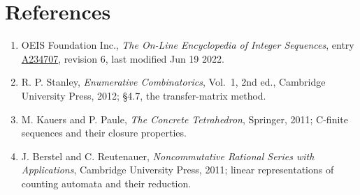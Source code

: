 \documentclass[11pt]{article}
\theoremstyle{definition}
\begin{document}
\section{References}

\begin{enumerate}

\item OEIS Foundation Inc., \emph{The On-Line Encyclopedia of Integer Sequences}, entry \href{https://oeis.org/A234707}{A234707}, revision 6, last modified Jun 19 2022.

\item R. P. Stanley, \emph{Enumerative Combinatorics}, Vol.~1, 2nd ed., Cambridge University Press, 2012; \S4.7, the transfer-matrix method.

\item M. Kauers and P. Paule, \emph{The Concrete Tetrahedron}, Springer, 2011; C-finite sequences and their closure properties.

\item J. Berstel and C. Reutenauer, \emph{Noncommutative Rational Series with Applications}, Cambridge University Press, 2011; linear representations of counting automata and their reduction.

\end{enumerate}
\end{document}
